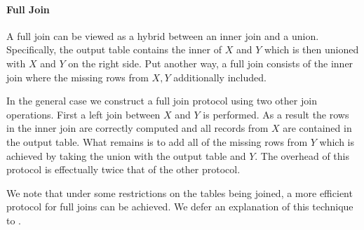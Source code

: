 \paragraph{Full Join}

A full join can be viewed as a hybrid between an inner join and a union. Specifically, the output table contains the inner of $X$ and $Y$ which is then unioned with $X$ and $Y$ on the right side. Put another way, a full join consists of the inner join where the missing rows from $X,Y$ additionally included. 

In the general case we construct a full join protocol using two other join operations. First a left join between $X$ and $Y$ is performed. As a result the rows in the inner join are correctly computed and all records from $X$ are contained in the output table. What remains is to add all of the missing rows from $Y$ which is achieved by taking the union with the output table and $Y$. The overhead of this protocol is effectually twice that of the other protocol.

We note that under some restrictions on the tables being joined, a more efficient protocol for full joins can be achieved. We defer an explanation of this technique to .

%
%
%
%
%
%


